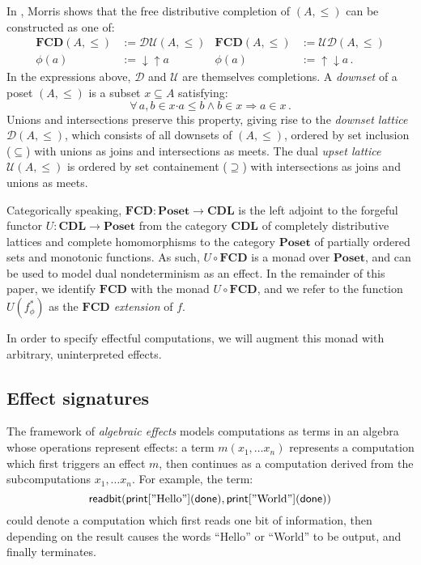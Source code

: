 \documentclass[format=sigplan,authordraft]{acmart}
\newcommand{\kw}[1]{\ensuremath{ \mathsf{#1} }}
\newcommand{\bdot}{\boldsymbol{\cdot}}
\begin{document}
In \cite{augtyp}, Morris shows that
the free distributive completion of $(A, \le)$
can be constructed as one of:
\begin{align*}
  \mathbf{FCD}(A, {\le}) &:= \mathcal{D} \mathcal{U}(A, {\le}) &
  \mathbf{FCD}(A, {\le}) &:= \mathcal{U} \mathcal{D}(A, {\le}) \\
  \phi(a) &:= {\downarrow}{\uparrow} a &
  \phi(a) &:= {\uparrow}{\downarrow} a \,.
\end{align*}
In the expressions above,
$\mathcal{D}$ and $\mathcal{U}$
are themselves completions.
A \emph{downset} of a poset $(A, {\le})$
is a subset $x \subseteq A$ satisfying:
\[
  \forall \, a, b \in x \bdot
          a \le b \wedge b \in x \Rightarrow a \in x \,.
\]
Unions and intersections preserve this property,
giving rise to the \emph{downset lattice} $\mathcal{D}(A, {\le})$,
which consists of all downsets of $(A, {\le})$,
ordered by set inclusion (${\subseteq}$) with
unions as joins and intersections as meets.
The dual \emph{upset lattice} $\mathcal{U}(A, {\le})$
is ordered by set containement (${\supseteq}$) with
intersections as joins and unions as meets.

Categorically speaking,
$\mathbf{FCD} : \mathbf{Poset} \rightarrow \mathbf{CDL}$
is the left adjoint to the forgeful functor
$U : \mathbf{CDL} \rightarrow \mathbf{Poset}$
from the category $\mathbf{CDL}$
of completely distributive lattices and complete homomorphisms
to the category $\mathbf{Poset}$
of partially ordered sets and monotonic functions.
As such, $U \! \circ \mathbf{FCD}$ is a monad over $\mathbf{Poset}$,
and can be used to model dual nondeterminism
as an effect.
In the remainder of this paper,
we identify $\mathbf{FCD}$ with
the monad $U \! \circ \mathbf{FCD}$,
and we refer to the function
$U(f_\phi^*)$ as the \emph{$\mathbf{FCD}$ extension} of $f$.

In order to specify effectful computations,
we will augment this monad with
arbitrary, uninterpreted effects.



\subsection{Effect signatures} \label{sec:bg:sig} %

The framework of \emph{algebraic effects}
models computations as terms in an algebra
whose operations represent effects:
a term $m(x_1, \ldots x_n)$
represents a computation which first
triggers an effect $m$,
then continues as a computation derived from
the subcomputations $x_1, \ldots x_n$.
For example,
the term:
\[
    \kw{readbit}(
      \kw{print}["\text{Hello}"](\kw{done}),
      \kw{print}["\text{World}"](\kw{done}))
\]
could denote a computation which
first reads one bit of information,
then depending on the result
causes the words ``Hello'' or ``World'' to be output,
and finally terminates.
\end{document}
